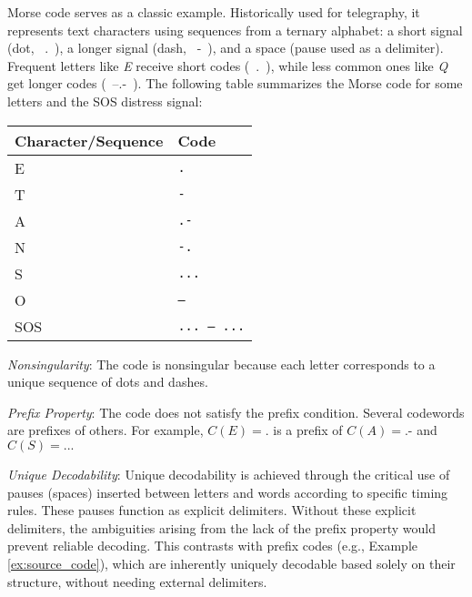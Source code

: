 \begin{example}\label{ex:morse_code}
    Morse code serves as a classic example. Historically used for telegraphy, it represents text characters using sequences from a ternary alphabet: a short signal (dot, ~.~), a longer signal (dash, ~-~), and a space (pause used as a delimiter). Frequent letters like \emph{E} receive short codes (~.~), while less common ones like \emph{Q} get longer codes (~--.-~).
    The following table summarizes the Morse code for some letters and the SOS distress signal:
    \begin{center}
        \begin{tabular}{ll}
            Character/Sequence & Code                 \\ \hline
            E                  & \texttt{.}           \\
            T                  & \texttt{-}           \\
            A                  & \texttt{.-}          \\
            N                  & \texttt{-.}          \\
            S                  & \texttt{...}         \\
            O                  & \texttt{---}         \\
            SOS                & \texttt{... --- ...} \\
        \end{tabular}
    \end{center}

    \emph{Nonsingularity}: The code is nonsingular because each letter corresponds to a unique sequence of dots and dashes.

    \emph{Prefix Property}: The code does not satisfy the prefix condition. Several codewords are prefixes of others. For example, $C(E) = \texttt{.}$ is a prefix of $C(A) = \texttt{.-}$ and $C(S) = \texttt{...}$

    \emph{Unique Decodability}: Unique decodability is achieved through the critical use of pauses (spaces) inserted between letters and words according to specific timing rules. These pauses function as explicit delimiters. Without these explicit delimiters, the ambiguities arising from the lack of the prefix property would prevent reliable decoding. This contrasts with prefix codes (e.g., Example \ref{ex:source_code}), which are inherently uniquely decodable based solely on their structure, without needing external delimiters.
\end{example}



